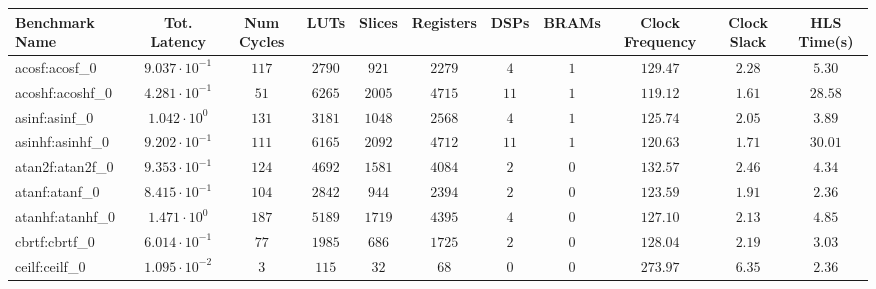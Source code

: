 \begin{tabular}{|l|c|c|c|c|c|c|c|c|c|c|}
\hline
Benchmark Name               & Tot. Latency            & Num Cycles & LUTs       & Slices    & Registers & DSPs    & BRAMs & Clock Frequency & Clock Slack & HLS Time(s) \\
\hline
acosf:acosf\_0               & $ 9.037 \cdot 10^{-1} $ & $ 117    $ & $ 2790   $ & $ 921   $ & $ 2279  $ & $ 4   $ & $ 1 $ & $ 129.47      $ & $ 2.28    $ & $ 5.30    $ \\
acoshf:acoshf\_0             & $ 4.281 \cdot 10^{-1} $ & $ 51     $ & $ 6265   $ & $ 2005  $ & $ 4715  $ & $ 11  $ & $ 1 $ & $ 119.12      $ & $ 1.61    $ & $ 28.58   $ \\
asinf:asinf\_0               & $ 1.042 \cdot 10^{0}  $ & $ 131    $ & $ 3181   $ & $ 1048  $ & $ 2568  $ & $ 4   $ & $ 1 $ & $ 125.74      $ & $ 2.05    $ & $ 3.89    $ \\
asinhf:asinhf\_0             & $ 9.202 \cdot 10^{-1} $ & $ 111    $ & $ 6165   $ & $ 2092  $ & $ 4712  $ & $ 11  $ & $ 1 $ & $ 120.63      $ & $ 1.71    $ & $ 30.01   $ \\
atan2f:atan2f\_0             & $ 9.353 \cdot 10^{-1} $ & $ 124    $ & $ 4692   $ & $ 1581  $ & $ 4084  $ & $ 2   $ & $ 0 $ & $ 132.57      $ & $ 2.46    $ & $ 4.34    $ \\
atanf:atanf\_0               & $ 8.415 \cdot 10^{-1} $ & $ 104    $ & $ 2842   $ & $ 944   $ & $ 2394  $ & $ 2   $ & $ 0 $ & $ 123.59      $ & $ 1.91    $ & $ 2.36    $ \\
atanhf:atanhf\_0             & $ 1.471 \cdot 10^{0}  $ & $ 187    $ & $ 5189   $ & $ 1719  $ & $ 4395  $ & $ 4   $ & $ 0 $ & $ 127.10      $ & $ 2.13    $ & $ 4.85    $ \\
cbrtf:cbrtf\_0               & $ 6.014 \cdot 10^{-1} $ & $ 77     $ & $ 1985   $ & $ 686   $ & $ 1725  $ & $ 2   $ & $ 0 $ & $ 128.04      $ & $ 2.19    $ & $ 3.03    $ \\
ceilf:ceilf\_0               & $ 1.095 \cdot 10^{-2} $ & $ 3      $ & $ 115    $ & $ 32    $ & $ 68    $ & $ 0   $ & $ 0 $ & $ 273.97      $ & $ 6.35    $ & $ 2.36    $ \\

\end{tabular}
